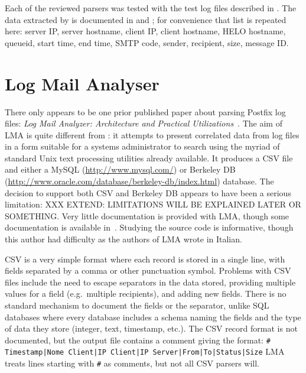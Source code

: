 Each of the reviewed parsers was tested with the \numberOFlogFILES{} test
log files described in .  The data extracted
by \parsername{} is documented in  and
; for convenience that list is repeated here:
server \gls{IP}, server hostname, client \gls{IP}, client hostname, HELO
hostname, queueid, start time, end time, \gls{SMTP} code, sender,
recipient, size, message ID\@.

\section{Log Mail Analyser}

\label{prior art}

There only appears to be one prior published paper about parsing Postfix
log files: \textit{Log Mail Analyzer: Architecture and Practical
Utilizations\/}~\cite{log-mail-analyser}.  The aim of \gls{LMA} is quite
different from \parsername{}: it attempts to present correlated data from
log files in a form suitable for a systems administrator to search using
the myriad of standard Unix text processing utilities already available.
It produces a \gls{CSV} file and either a MySQL
(\url{http://www.mysql.com/}) or Berkeley DB
(\url{http://www.oracle.com/database/berkeley-db/index.html}) database.
The decision to support both \gls{CSV} and Berkeley DB appears to have been
a serious limitation: XXX EXTEND\@: LIMITATIONS WILL BE EXPLAINED LATER OR
SOMETHING\@.  Very little documentation is provided with \gls{LMA}, though
some documentation is available in~\cite{log-mail-analyser}.  Studying the
source code is informative, though this author had difficulty as the
authors of \gls{LMA} wrote in Italian.

\gls{CSV} is a very simple format where each record is stored in a single
line, with fields separated by a comma or other punctuation symbol.
Problems with \gls{CSV} files include the need to escape separators in the
data stored, providing multiple values for a field (e.g.\ multiple
recipients), and adding new fields.  There is no standard mechanism to
document the fields or the separator, unlike \gls{SQL} databases where
every database includes a schema naming the fields and the type of data
they store (integer, text, timestamp, etc.).  The \gls{CSV} record format
is not documented, but the output file contains a comment giving the
format:\newline{} \texttt{\# Timestamp|Nome Client|IP Client|IP
Server|From|To|Status|Size} \newline{}\gls{LMA} treats lines starting with
\texttt{\#} as comments, but not all \gls{CSV} parsers will.

